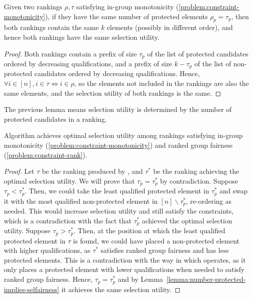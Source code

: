 \begin{lemma}\label{lemma:number-protected-implies-selfairness} %
	Given two rankings $\rho, \tau$ satisfying in-group monotonicity (\ref{problem:constraint-monotonicity}), if they have the same number of protected elements $\rho_p = \tau_p$, then both rankings contain the same $k$ elements (possibly in different order), and hence both rankings have the same selection utility.
\end{lemma}

\begin{proof}
	Both rankings contain a prefix of size $\tau_p$ of the list of protected candidates ordered by decreasing qualifications, and a prefix of size $k - \tau_p$ of the list of non-protected candidates ordered by decreasing qualifications. 
	Hence, $\forall i \in [n], i \in \tau \Leftrightarrow i \in \rho$, so the elements not included in the rankings are also the same elements, and the selection utility of both rankings is the same.
\end{proof}

The previous lemma means selection utility is determined by the number of protected candidates in a ranking.

\begin{lemma}\label{lemma:fair-optimal-selection}
	Algorithm \algoFAIR achieves optimal selection utility among rankings satisfying in-group monotonicity (\ref{problem:constraint-monotonicity}) and ranked group fairness (\ref{problem:constraint-rank}).
\end{lemma}

\begin{proof}
	Let $\tau$ be the ranking produced by \algoFAIR, and $\tau^*$ be the ranking achieving the optimal selection utility. We will prove that $\tau_p = \tau^*_p$ by contradiction.
	Suppose $\tau_p < \tau^*_p$. Then, we could take the least qualified protected element in $\tau^*_p$ and swap it with the most qualified non-protected element in $[n] \backslash \tau^*_p$, re-ordering as needed. This would increase selection utility and still satisfy the constraints, which is a contradiction with the fact that $\tau^*_p$ achieved the optimal selection utility.
	Suppose $\tau_p > \tau^*_p$. Then, at the position at which the least qualified protected element in $\tau$ is found, we could have placed a non-protected element with higher qualifications, as $\tau^*$ satisfies ranked group fairness and has less protected elements. This is a contradiction with the way in which \algoFAIR operates, as it only places a protected element with lower qualifications when needed to satisfy ranked group fairness.
	Hence, $\tau_p = \tau^*_p$ and by Lemma~\ref{lemma:number-protected-implies-selfairness} it achieves the same selection utility.
\end{proof}

